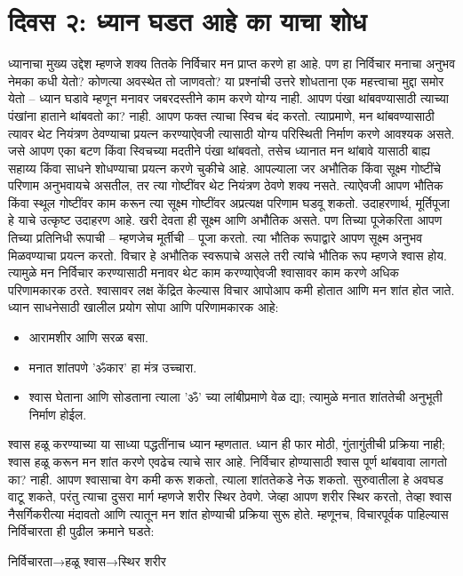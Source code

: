 \section*{दिवस २: ध्यान घडत आहे का याचा शोध}
ध्यानाचा मुख्य उद्देश म्हणजे शक्य तितके निर्विचार मन प्राप्त करणे हा आहे. पण हा निर्विचार मनाचा अनुभव नेमका कधी येतो? कोणत्या अवस्थेत तो जाणवतो? या प्रश्नांची उत्तरे शोधताना एक महत्त्वाचा मुद्दा समोर येतो – ध्यान घडावे म्हणून मनावर जबरदस्तीने काम करणे योग्य नाही. आपण पंखा थांबवण्यासाठी त्याच्या पंखांना हाताने थांबवतो का? नाही. आपण फक्त त्याचा स्विच बंद करतो. त्याप्रमाणे, मन थांबवण्यासाठी त्यावर थेट नियंत्रण ठेवण्याचा प्रयत्न करण्याऐवजी त्यासाठी योग्य परिस्थिती निर्माण करणे आवश्यक असते. जसे आपण एका बटण किंवा स्विचच्या मदतीने पंखा थांबवतो, तसेच ध्यानात मन थांबावे यासाठी बाह्य सहाय्य किंवा साधने शोधण्याचा प्रयत्न करणे चुकीचे आहे.
आपल्याला जर अभौतिक किंवा सूक्ष्म गोष्टींचे परिणाम अनुभवायचे असतील, तर त्या गोष्टींवर थेट नियंत्रण ठेवणे शक्य नसते. त्याऐवजी आपण भौतिक किंवा स्थूल गोष्टींवर काम करून त्या सूक्ष्म गोष्टींवर अप्रत्यक्ष परिणाम घडवू शकतो. उदाहरणार्थ, मूर्तिपूजा हे याचे उत्कृष्ट उदाहरण आहे. खरी देवता ही सूक्ष्म आणि अभौतिक असते. पण तिच्या पूजेकरिता आपण तिच्या प्रतिनिधी रूपाची – म्हणजेच मूर्तीची – पूजा करतो. त्या भौतिक रूपाद्वारे आपण सूक्ष्म अनुभव मिळवण्याचा प्रयत्न करतो.
विचार हे अभौतिक स्वरूपाचे असले तरी त्यांचे भौतिक रूप म्हणजे श्वास होय. त्यामुळे मन निर्विचार करण्यासाठी मनावर थेट काम करण्याऐवजी श्वासावर काम करणे अधिक परिणामकारक ठरते. श्वासावर लक्ष केंद्रित केल्यास विचार आपोआप कमी होतात आणि मन शांत होत जाते.
ध्यान साधनेसाठी खालील प्रयोग सोपा आणि परिणामकारक आहे:
\begin{itemize}
 \item आरामशीर आणि सरळ बसा.
 \item मनात शांतपणे 'ॐकार' हा मंत्र उच्चारा.
 \item श्वास घेताना आणि सोडताना त्याला 'ॐ' च्या लांबीप्रमाणे वेळ द्या; त्यामुळे मनात शांततेची अनुभूती निर्माण होईल.
 \end{itemize}
श्वास हळू करण्याच्या या साध्या पद्धतींनाच ध्यान म्हणतात. ध्यान ही फार मोठी, गुंतागुंतीची प्रक्रिया नाही; श्वास हळू करून मन शांत करणे एवढेच त्याचे सार आहे.
निर्विचार होण्यासाठी श्वास पूर्ण थांबवावा लागतो का? नाही. आपण श्वासाचा वेग कमी करू शकतो, त्याला शांततेकडे नेऊ शकतो. सुरुवातीला हे अवघड वाटू शकते, परंतु त्याचा दुसरा मार्ग म्हणजे शरीर स्थिर ठेवणे. जेव्हा आपण शरीर स्थिर करतो, तेव्हा श्वास नैसर्गिकरीत्या मंदावतो आणि त्यातून मन शांत होण्याची प्रक्रिया सुरू होते.
म्हणूनच, विचारपूर्वक पाहिल्यास निर्विचारता ही पुढील क्रमाने घडते:

निर्विचारता→हळू श्वास→स्थिर शरीर

